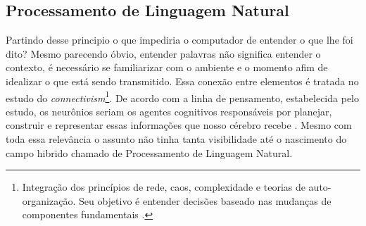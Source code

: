 \subsection{Processamento de Linguagem Natural}
Partindo desse principio o que impediria o computador de entender o que lhe foi dito? Mesmo parecendo óbvio, entender palavras não significa entender o contexto, é necessário se familiarizar com o ambiente e o momento afim de idealizar o que está sendo transmitido. Essa conexão entre elementos é tratada no estudo do \textit{connectivism}\footnote{Integração dos princípios de rede, caos, complexidade e teorias de auto-organização. Seu objetivo é entender decisões baseado nas mudanças de componentes fundamentais \cite[5]{siemens2014connectivism}.}. De acordo com a linha de pensamento, estabelecida pelo estudo, os neurônios seriam os agentes cognitivos responsáveis por planejar, construir e representar essas informações que nosso cérebro recebe \cite[22]{brandura1996}. Mesmo com toda essa relevância o assunto não tinha tanta visibilidade até o nascimento  do campo hibrido chamado de Processamento de Linguagem Natural. \cite[16]{russell2003artificial}